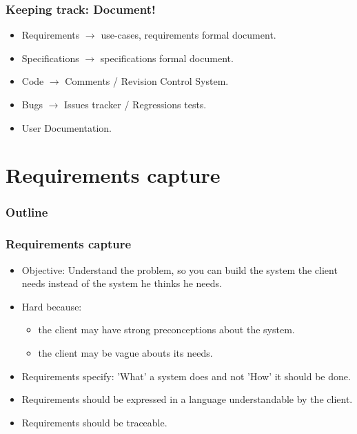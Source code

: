 \documentclass[10pt, handout]{beamer}
\begin{document}
\begin{frame}[fragile]
  \frametitle{Keeping track: Document!}
  \begin{itemize}
  \item Requirements $\longrightarrow$ use-cases, requirements formal document.
  \item Specifications $\longrightarrow$ specifications formal document.
  \item Code $\longrightarrow$ Comments / Revision Control System.
  \item Bugs $\longrightarrow$ Issues tracker / Regressions tests.
  \item User Documentation.
  \end{itemize}
\end{frame}

\section{Requirements capture}

\begin{frame}
  \frametitle{Outline}
  \tableofcontents[currentsection]
\end{frame}

\begin{frame}[fragile]
  \frametitle{Requirements capture}
  \begin{itemize}
  \item Objective: Understand the problem,
    so you can build the system the client needs instead of the system he
    thinks he needs.
  \item Hard because:
    \begin{itemize}
    \item the client may have strong preconceptions about the system.
    \item the client may be vague abouts its needs.
    \end{itemize}
  \item Requirements specify: 'What' a system does and not 'How' it should be
      done.
  \item Requirements should be expressed in a language understandable by the
    client.
  \item Requirements should be traceable.
  \end{itemize}
\end{frame}
\end{document}

